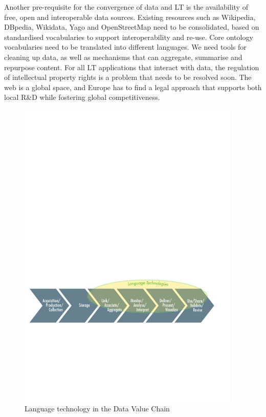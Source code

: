 \documentclass[10pt, plain]{../../metanetpaper}
\begin{document}
\begin{multicols}{2}
Another pre-requisite for the convergence of data and LT is the availability of free, open and interoperable data sources. Existing resources such as Wikipedia, DBpedia, Wikidata, Yago and OpenStreetMap need to be consolidated, based on standardised vocabularies to support interoperability and re-use. Core ontology vocabularies need to be translated into different languages. We need tools for cleaning up data, as well as mechanisms that can aggregate, summarise and repurpose content. For all LT applications that interact with data, the regulation of intellectual property rights is a problem that needs to be resolved soon. The web is a global space, and Europe has to find a legal approach that supports both local R\&D while fostering global competitiveness.

\begin{figure}[htb]
  \center
  \includegraphics[width=0.95\textwidth]{../_media/DataValueChain.pdf}
  \caption{Language technology in the Data Value Chain}
  \label{fig:lt-and-data-value-chain}
\end{figure}


\end{multicols}
\end{document}

